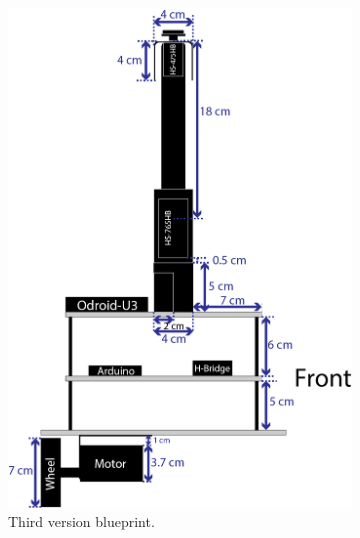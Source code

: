 \begin{figure}[h]
\begin{subfigure}[c]{0.3\textwidth}
	\includegraphics[width=\textwidth]{./Images/upperFourthD.png}
	\caption{Third version blueprint.}
	\label{fig:triskar-third-design}
	\end{subfigure}
	\begin{subfigure}[c]{0.3\textwidth}
	\centering

\end{subfigure}
\end{figure}
